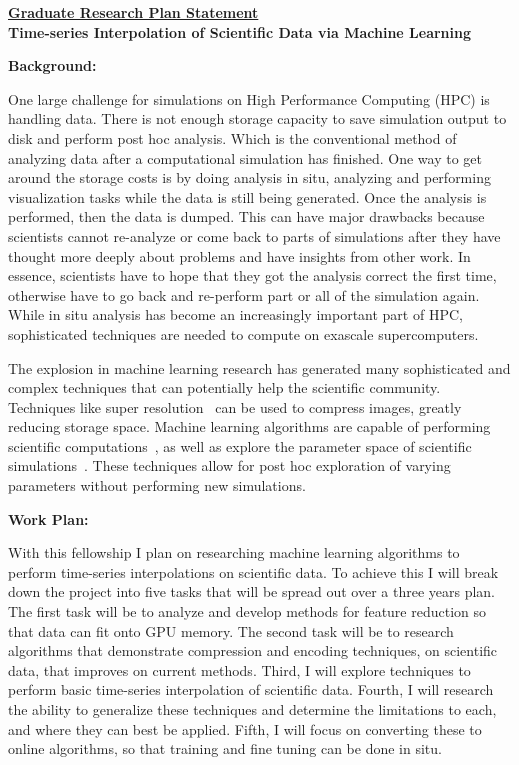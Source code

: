 \documentclass[12pt]{article}
\begin{document}
\begin{center}
\underline{\bf Graduate Research Plan Statement}\\
{\bf Time-series Interpolation of Scientific Data via Machine Learning} \\
\end{center}

\noindent
\textbf{Background:}
%

\noindent One large challenge for simulations on High Performance Computing
(HPC) is handling data. There is not enough storage capacity to save simulation
output to disk and perform post hoc analysis. Which is the conventional method
of analyzing data after a computational simulation has finished. One way to get
around the storage costs is by doing analysis in situ, analyzing and performing
visualization tasks while the data is still being generated. Once the analysis
is performed, then the data is dumped. This can have major drawbacks because
scientists cannot re-analyze or come back to parts of simulations after they
have thought more deeply about problems and have insights from other work. In
essence, scientists have to hope that they got the analysis correct the first
time, otherwise have to go back and re-perform part or all of the simulation
again. While in situ analysis has become an increasingly important part of HPC,
sophisticated techniques are needed to compute on exascale supercomputers.

\noindent The explosion in machine learning research has generated many
sophisticated and complex techniques that can potentially help the scientific
community. Techniques like super resolution~\cite{super} can be used to
compress images, greatly reducing storage space. Machine learning algorithms are
capable of performing scientific computations~\cite{Berg}, as well as explore
the parameter space of scientific simulations~\cite{He}. These techniques 
allow for post hoc exploration of varying parameters without performing new
simulations.

\noindent
\textbf{Work Plan:}

\noindent With this fellowship I plan on researching machine learning algorithms
to perform time-series interpolations on scientific data. To achieve this I will
break down the project into five tasks that will be spread out over a three
years plan. The first task will be to analyze and develop methods for feature
reduction so that data can fit onto GPU memory. The second task will be to
research algorithms that demonstrate compression and encoding techniques, on
scientific data, that improves on current methods. Third, I will explore
techniques to perform basic time-series interpolation of scientific data.
Fourth, I will research the ability to generalize these techniques and determine
the limitations to each, and where they can best be applied. Fifth, I will focus
on converting these to online algorithms, so that training and fine tuning can
be done in situ.
\end{document}
